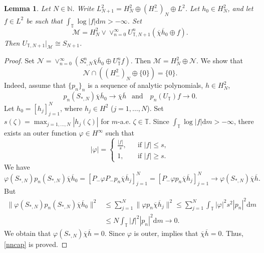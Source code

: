 \documentclass[a4paper,oneside,11pt]{amsart}
\numberwithin{equation}{section}
\theoremstyle{plain}
\newtheorem{lemma}[theorem]{Lemma}
\theoremstyle{definition}
\begin{document}
\begin{lemma}\label{lem13} Let $N\in\mathbb N$. Write $L^2_{N+1}=H^2_N\oplus (H^2_-)_N\oplus L^2$. 
Let $h_0\in H^2_N$, and let $f\in L^2$ be such that $\int_{\mathbb T}\log|f|\mathrm{d}m>-\infty$. 
Set \begin{equation*}
\mathcal M=H^2_N\vee\vee_{n=0}^\infty U_{\mathbb T, N+1}^n(\overline\chi\overline h_0\oplus f).
\end{equation*}
Then  $U_{\mathbb T, N+1}|_{\mathcal M}\cong S_{N+1}$.
\end{lemma}

\begin{proof} Set $\mathcal N=\vee_{n=0}^\infty( S_{*,N}^n\overline\chi\overline h_0\oplus U_{\mathbb T}^n f)$.
Then $\mathcal M=H^2_N\oplus\mathcal N$. We show that 
 \begin{equation}\label{nncap}
\mathcal N\cap((H^2_-)_N\oplus\{0\})=\{0\}. 
\end{equation}
Indeed, assume that $\{p_n\}_n$ is a sequence of analytic polynomials, $h\in H^2_N$,  
\begin{equation*} p_n(S_{*,N}) \overline\chi\overline h_0\to \overline\chi\overline h \ \ \text{ and } \ \ \ 
p_n( U_{\mathbb T})f \to 0.
\end{equation*}
Let $h_0=[h_j]_{j=1}^N$, where $h_j\in H^2$ ($j=1,\ldots, N$). Set $s(\zeta)=\max_{j=1,\ldots, N}|h_j(\zeta)|$ for $m$-a.e. $\zeta\in\mathbb T$.
Since $\int_{\mathbb T}\log|f|\mathrm{d}m>-\infty$, there exists an outer function $\varphi\in H^\infty$ such that 
\begin{equation*} |\varphi|=\begin{cases}\frac{|f|}{s}, & \ \ \text{ if }|f|\leq s,\\
1, & \ \ \text{ if }|f|\geq s.
\end{cases}
\end{equation*}
We have \begin{equation*}\varphi(S_{*,N})p_n(S_{*,N}) \overline\chi\overline h_0=[P_-\varphi P_-p_n\overline\chi\overline h_j]_{j=1}^N
=[P_-\varphi p_n\overline\chi\overline h_j]_{j=1}^N
\to \varphi(S_{*,N})\overline\chi\overline h.
\end{equation*}
But  \begin{align*}\|\varphi(S_{*,N})p_n(S_{*,N}) \overline\chi\overline h_0\|^2&
\leq\sum_{j=1}^N\|\varphi p_n\overline\chi\overline h_j\|^2
\leq \sum_{j=1}^N\int_{\mathbb T}|\varphi|^2s^2|p_n|^2\mathrm{d}m\\&\leq N\int_{\mathbb T}|f|^2|p_n|^2\mathrm{d}m\to 0.
\end{align*}
We obtain that $\varphi(S_{*,N})\overline\chi\overline h=0$. Since $\varphi$ is outer, {\cite[Prop. III.3.1]{nfbk}} implies that  $\overline\chi\overline h=0$. Thus, \eqref{nncap} is proved. 


\end{proof}
\end{document}
